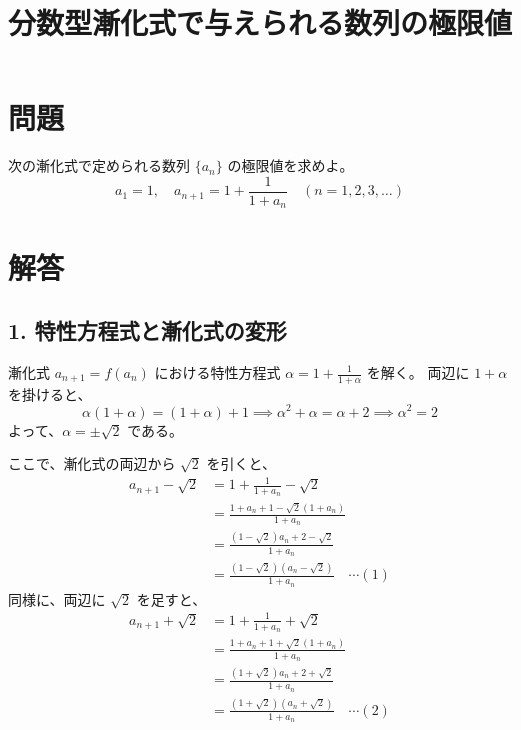 \documentclass[a4paper,11pt]{jsarticle}
\begin{document}
\title{分数型漸化式で与えられる数列の極限値}
\date{}
\maketitle

\section*{問題}
次の漸化式で定められる数列 $\{a_n\}$ の極限値を求めよ。
\[
a_1 = 1, \quad a_{n+1} = 1 + \frac{1}{1 + a_n} \quad (n = 1, 2, 3, \dots)
\]

\section*{解答}
\subsection*{1. 特性方程式と漸化式の変形}
漸化式 $a_{n+1} = f(a_n)$ における特性方程式 $\alpha = 1 + \frac{1}{1 + \alpha}$ を解く。
両辺に $1 + \alpha$ を掛けると、
\[
\alpha(1 + \alpha) = (1 + \alpha) + 1 \implies \alpha^2 + \alpha = \alpha + 2 \implies \alpha^2 = 2
\]
よって、$\alpha = \pm\sqrt{2}$ である。

ここで、漸化式の両辺から $\sqrt{2}$ を引くと、
\begin{align*}
a_{n+1} - \sqrt{2} &= 1 + \frac{1}{1 + a_n} - \sqrt{2} \\
&= \frac{1 + a_n + 1 - \sqrt{2}(1 + a_n)}{1 + a_n} \\
&= \frac{(1-\sqrt{2})a_n + 2 - \sqrt{2}}{1 + a_n} \\
&= \frac{(1-\sqrt{2})(a_n - \sqrt{2})}{1 + a_n} \quad \cdots (1)
\end{align*}
同様に、両辺に $\sqrt{2}$ を足すと、
\begin{align*}
a_{n+1} + \sqrt{2} &= 1 + \frac{1}{1 + a_n} + \sqrt{2} \\
&= \frac{1 + a_n + 1 + \sqrt{2}(1 + a_n)}{1 + a_n} \\
&= \frac{(1+\sqrt{2})a_n + 2 + \sqrt{2}}{1 + a_n} \\
&= \frac{(1+\sqrt{2})(a_n + \sqrt{2})}{1 + a_n} \quad \cdots (2)
\end{align*}
\end{document}
